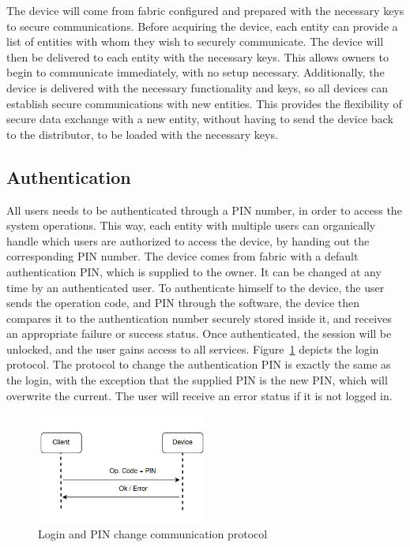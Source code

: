 The device will come from fabric configured and prepared with the necessary keys to secure communications.
Before acquiring the device, each entity can provide a list of entities with whom they wish to securely communicate. The device will then be delivered to each entity with the necessary keys. This allows owners to begin to communicate immediately, with no setup necessary.
Additionally, the device is delivered with the necessary functionality and keys, so all devices can establish secure communications with new entities. This provides the flexibility of secure data exchange with a new entity, without having to send the device back to the distributor, to be loaded with the necessary keys.

\subsection{Authentication}\label{chap:arch:services:auth}

All users needs to be authenticated through a PIN number, in order to access the system operations. This way, each entity with multiple users can organically handle which users are authorized to access the device, by handing out the corresponding PIN number.
The device comes from fabric with a default authentication PIN, which is supplied to the owner. It can be changed at any time by an authenticated user.
To authenticate himself to the device, the user sends the operation code, and PIN through the software, the device then compares it to the authentication number securely stored inside it, and receives an appropriate failure or success status. Once authenticated, the session will be unlocked, and the user gains access to all services.
Figure~\ref{fig:protocol:login} depicts the login protocol.
The protocol to change the authentication PIN is exactly the same as the login, with the exception that the supplied PIN is the new PIN, which will overwrite the current. The user will receive an error status if it is not logged in.

\begin{figure}[h!]
	\centering
	\includegraphics[width=0.50\textwidth]{./Images/authentication.png}
	\caption{Login and PIN change communication protocol}
	\label{fig:protocol:login}
\end{figure}


